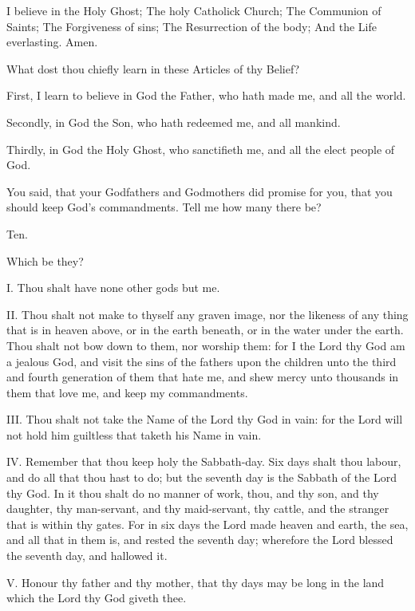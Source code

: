 I believe in the Holy Ghost; The holy Catholick Church; The Communion of Saints; The Forgiveness of sins; The Resurrection of the body; And the Life everlasting. Amen.

\centerline{}
What dost thou chiefly learn in these Articles of thy Belief?

 First, I learn to believe in God the Father, who hath made me, and all the world.

Secondly, in God the Son, who hath redeemed me, and all mankind.

Thirdly, in God the Holy Ghost, who sanctifieth me, and all the elect people of God.

\medskip
\centerline{}
You said, that your Godfathers and Godmothers did promise for you, that you should keep God's commandments. Tell me how many there be?

 Ten.

 Which be they?

\centerline{}

I. Thou shalt have none other gods but me.

II. Thou shalt not make to thyself any graven image, nor the likeness of any thing that is in heaven above, or in the earth beneath, or in the water under the earth. Thou shalt not bow down to them, nor worship them: for I the Lord thy God am a jealous God, and visit the sins of the fathers upon the children unto the third and fourth generation of them that hate me, and shew mercy unto thousands in them that love me, and keep my commandments.

III. Thou shalt not take the Name of the Lord thy God in vain: for the Lord will not hold him guiltless that taketh his Name in vain.

IV. Remember that thou keep holy the Sabbath-day. Six days shalt thou labour, and do all that thou hast to do; but the seventh day is the Sabbath of the Lord thy God. In it thou shalt do no manner of work, thou, and thy son, and thy daughter, thy man-servant, and thy maid-servant, thy cattle, and the stranger that is within thy gates. For in six days the Lord made heaven and earth, the sea, and all that in them is, and rested the seventh day; wherefore the Lord blessed the seventh day, and hallowed it.

V. Honour thy father and thy mother, that thy days may be long in the land which the Lord thy God giveth thee.

